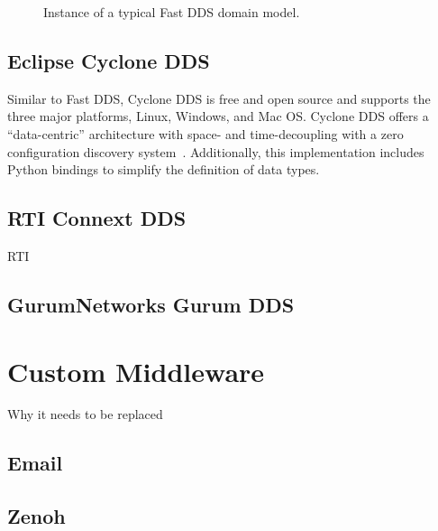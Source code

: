 \begin{figure}[htbp]
        \vspace{1em}
        \caption{Instance of a typical Fast \ac{DDS} domain model.}
        \label{fig:ddsdomain}
    \end{figure}

    \subsection{Eclipse Cyclone DDS}

        Similar to Fast \ac{DDS}, Cyclone \ac{DDS} is free and open source and supports the three major platforms, Linux, Windows, and Mac OS. Cyclone \ac{DDS} offers a ``data-centric'' architecture with space- and time-decoupling with a zero configuration discovery system~\cite{eclipse}. Additionally, this implementation includes Python bindings to simplify the definition of data types.

    \subsection{RTI Connext DDS}

        \ac{RTI}

    \subsection{GurumNetworks Gurum DDS}

    


\section{Custom Middleware}

    Why it needs to be replaced

    \subsection{Email}

    \subsection{Zenoh}


